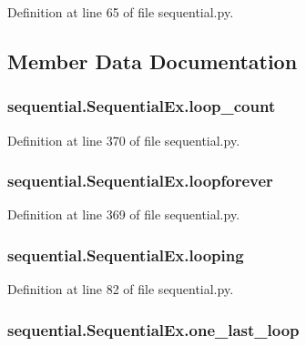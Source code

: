 Definition at line 65 of file sequential.\-py.



\subsection{Member Data Documentation}
\hypertarget{classsequential_1_1_sequential_ex_a4ba41b6f01a147966df8df335d570d22}{
\subsubsection[{loop\-\_\-count}]{\setlength{\rightskip}{0pt plus 5cm}sequential.\-Sequential\-Ex.\-loop\-\_\-count}}\label{classsequential_1_1_sequential_ex_a4ba41b6f01a147966df8df335d570d22}


Definition at line 370 of file sequential.\-py.

\hypertarget{classsequential_1_1_sequential_ex_a8cf719781ed7aa81bb27e30d4281cb66}{
\subsubsection[{loopforever}]{\setlength{\rightskip}{0pt plus 5cm}sequential.\-Sequential\-Ex.\-loopforever}}\label{classsequential_1_1_sequential_ex_a8cf719781ed7aa81bb27e30d4281cb66}


Definition at line 369 of file sequential.\-py.

\hypertarget{classsequential_1_1_sequential_ex_a548a626b1a098a7ad2e0709fc97fa8f7}{
\subsubsection[{looping}]{\setlength{\rightskip}{0pt plus 5cm}sequential.\-Sequential\-Ex.\-looping}}\label{classsequential_1_1_sequential_ex_a548a626b1a098a7ad2e0709fc97fa8f7}


Definition at line 82 of file sequential.\-py.

\hypertarget{classsequential_1_1_sequential_ex_a3dbe6e22b44436f3fef2c114550ad8ca}{
\subsubsection[{one\-\_\-last\-\_\-loop}]{\setlength{\rightskip}{0pt plus 5cm}sequential.\-Sequential\-Ex.\-one\-\_\-last\-\_\-loop}}\label{classsequential_1_1_sequential_ex_a3dbe6e22b44436f3fef2c114550ad8ca}


